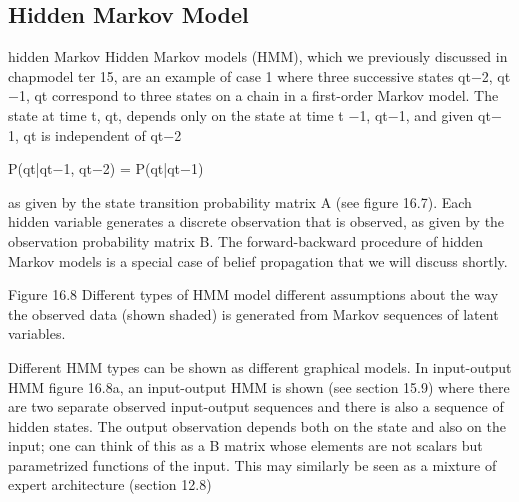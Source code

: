 \subsection{Hidden Markov Model}

hidden Markov Hidden Markov models (HMM), which we previously discussed in chapmodel ter 15, are an example of case 1 where three successive states qt$-$2, qt$-$1, qt correspond to three states on a chain in a first-order Markov model. The state at time t, qt, depends only on the state at time t $-$1, qt$-$1, and given qt$-$1, qt is independent of qt$-$2

P(qt|qt$-$1, qt$-$2) = P(qt|qt$-$1)

as given by the state transition probability matrix A (see figure 16.7). Each hidden variable generates a discrete observation that is observed, as given by the observation probability matrix B. The forward-backward procedure of hidden Markov models is a special case of belief propagation that we will discuss shortly.

Figure 16.8 Different types of HMM model different assumptions about the way the observed data (shown shaded) is generated from Markov sequences of latent variables.

Different HMM types can be shown as different graphical models. In input-output HMM figure 16.8a, an input-output HMM is shown (see section 15.9) where there are two separate observed input-output sequences and there is also a sequence of hidden states. The output observation depends both on the state and also on the input; one can think of this as a B matrix whose elements are not scalars but parametrized functions of the input. This may similarly be seen as a mixture of expert architecture (section 12.8)

